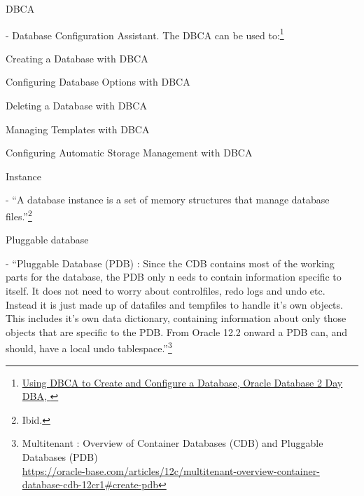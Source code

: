 \begin{itemize*}
\item{\begin{bf}DBCA\end{bf}} - Database Configuration Assistant.  The DBCA can be used to:\footnote{\href{https://docs.oracle.com/cd/B16254_01/doc/server.102/b14196/install003.htm}{Using DBCA to Create and Configure a Database, Oracle\textregistered \hspace{1pt} Database 2 Day DBA, }}
\begin{itemize*}
  \item Creating a Database with DBCA
  \item Configuring Database Options with DBCA
  \item Deleting a Database with DBCA
  \item Managing Templates with DBCA
  \item Configuring Automatic Storage Management with DBCA
\end{itemize*}


\item{\begin{bf}Instance\end{bf}} - ``A database instance
  is a set of memory structures that manage database files.''\footnote{Ibid.}
  

\item{\begin{bf}Pluggable database\end{bf}} - ``Pluggable Database (PDB) : Since 
the CDB contains most of the working parts for the database, the PDB only n
eeds to contain information specific to itself. It does not need to worry about 
controlfiles, redo logs and undo etc. Instead it is just made up of datafiles 
and tempfiles to handle it's own objects. This includes it's own data dictionary, 
containing information about only those objects that are specific to the PDB. 
From Oracle 12.2 onward a PDB can, and should, have a local undo tablespace.''\footnote{Multitenant : Overview of Container Databases (CDB) and Pluggable Databases (PDB)\\
\href{https://oracle-base.com/articles/12c/multitenant-overview-container-database-cdb-12cr1\#create-pdb}{https://oracle-base.com/articles/12c/multitenant-overview-container-database-cdb-12cr1\#create-pdb}}




\end{itemize*}


